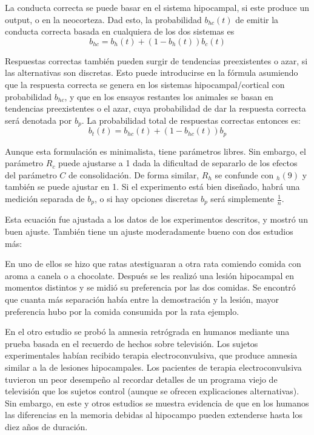 \documentclass[a4paper,12pt]{article}
\begin{document}
La conducta correcta se puede basar en el sistema hipocampal, si este produce un output, o en la neocorteza. Dad esto, la probabilidad $b_{hc}(t)$ de emitir la conducta correcta basada en cualquiera de los  dos sistemas es 
\begin{equation}
	b_{hc}=
	b_{h}(t)
	+
	(1-b_{h}(t))
	b_{c}(t)
\end{equation}


Respuestas correctas también pueden surgir de tendencias preexistentes o azar, si las alternativas son discretas. Esto puede introducirse en la fórmula asumiendo que la respuesta correcta se genera en los sistemas hipocampal/cortical con probabilidad $b_{hc}$, y que en los ensayos restantes los animales se basan en tendencias preexistentes  o el azar, cuya probabilidad de dar la respuesta correcta será denotada por $b_{p}$. La probabilidad total de respuestas correctas  entonces es:
\begin{equation}
	b_{t}(t) =
	b_{hc}(t)
	+
	(1-b_{hc}(t)) b_{p}
\end{equation}

Aunque esta formulación es minimalista, tiene parámetros libres. Sin embargo, el parámetro $R_{c}$ puede ajustarse a 1 dada la dificultad de separarlo de los efectos del parámetro $C$  de consolidación. De forma similar, $R_{h}$ se confunde con $_{h}(9)$ y también se puede ajustar en 1. Si el experimento está bien diseñado, habrá una medición separada de $b_{p}$, o si hay opciones discretas $b_{p}$ será simplemente $\frac{1}{n}$.

Esta ecuación fue ajustada a los datos de los experimentos descritos, y mostró un buen ajuste. También tiene un ajuste moderadamente bueno con dos estudios más:

En uno de ellos se hizo que ratas atestiguaran a otra rata comiendo comida con aroma a canela o a chocolate. Después se les realizó una lesión hipocampal en momentos distintos y se midió su preferencia por las dos comidas. Se encontró que cuanta más separación había entre la demostración y la lesión, mayor preferencia hubo por la comida consumida por la rata ejemplo. 

En el otro estudio se probó la amnesia retrógrada en humanos mediante una prueba basada en el recuerdo de hechos sobre televisión. Los sujetos experimentales habían recibido terapia electroconvulsiva, que produce amnesia similar a la de lesiones hipocampales. Los pacientes de terapia electroconvulsiva tuvieron un peor desempeño al recordar detalles de un programa viejo de televisión que los sujetos control (aunque se ofrecen explicaciones alternativas). Sin embargo, en este y otros estudios se muestra evidencia de que en los humanos las diferencias en la memoria debidas al hipocampo pueden extenderse hasta los diez años de duración.
\end{document}
